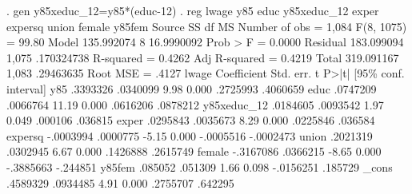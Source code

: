 . gen y85xeduc_12=y85*(educ-12)
{\smallskip}
. reg lwage y85 educ y85xeduc_12 exper expersq union female y85fem
{\smallskip}
      Source {\VBAR}       SS           df       MS      Number of obs   =     1,084
   F(8, 1075)      =     99.80
       Model {\VBAR}  135.992074         8  16.9990092   Prob > F        =    0.0000
    Residual {\VBAR}  183.099094     1,075  .170324738   R-squared       =    0.4262
   Adj R-squared   =    0.4219
       Total {\VBAR}  319.091167     1,083   .29463635   Root MSE        =     .4127
{\smallskip}
       lwage {\VBAR} Coefficient  Std. err.      t    P>|t|     [95\% conf. interval]
         y85 {\VBAR}   .3393326   .0340099     9.98   0.000     .2725993    .4060659
        educ {\VBAR}   .0747209   .0066764    11.19   0.000     .0616206    .0878212
 y85xeduc_12 {\VBAR}   .0184605   .0093542     1.97   0.049      .000106     .036815
       exper {\VBAR}   .0295843   .0035673     8.29   0.000     .0225846     .036584
     expersq {\VBAR}  -.0003994   .0000775    -5.15   0.000    -.0005516   -.0002473
       union {\VBAR}   .2021319   .0302945     6.67   0.000     .1426888    .2615749
      female {\VBAR}  -.3167086   .0366215    -8.65   0.000    -.3885663    -.244851
      y85fem {\VBAR}    .085052    .051309     1.66   0.098    -.0156251     .185729
       _cons {\VBAR}   .4589329   .0934485     4.91   0.000     .2755707     .642295
{\smallskip}
